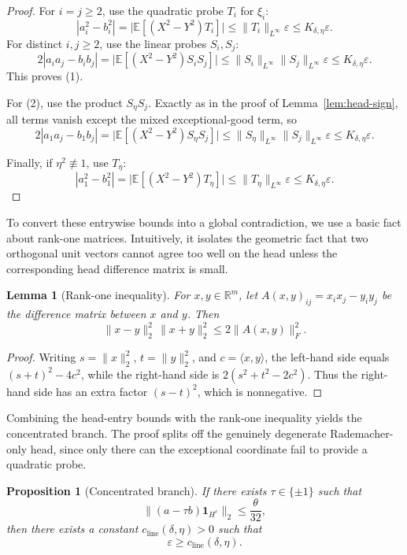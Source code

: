 \documentclass[11pt]{amsart}
\numberwithin{equation}{section}
\newtheorem{proposition}[theorem]{Proposition}
\newtheorem{lemma}[theorem]{Lemma}
\theoremstyle{definition}
\theoremstyle{remark}
\newcommand{\E}{\mathbb E}
\newcommand{\R}{\mathbb R}
\newcommand{\eps}{\varepsilon}
\newcommand{\norm}[1]{\lVert #1 \rVert}
\newcommand{\ip}[2]{\langle #1,#2\rangle}
\begin{document}
\begin{proof}
For $i=j\ge2$, use the quadratic probe $T_i$ for $\xi_i$:
\[
|a_i^2-b_i^2|
=\bigl|\E[(X^2-Y^2)T_i]\bigr|
\le \norm{T_i}_{L^\infty}\eps
\le K_{\delta,\eta}\eps.
\]
For distinct $i,j\ge2$, use the linear probes $S_i,S_j$:
\[
2|a_i a_j-b_i b_j|
=\bigl|\E[(X^2-Y^2)S_iS_j]\bigr|
\le \norm{S_i}_{L^\infty}\norm{S_j}_{L^\infty}\eps
\le K_{\delta,\eta}\eps.
\]
This proves \rm(1).

For \rm(2), use the product $S_\eta S_j$.  Exactly as in the proof of
Lemma~\ref{lem:head-sign}, all terms vanish except the mixed
exceptional-good term, so
\[
2|a_1a_j-b_1b_j|
=\bigl|\E[(X^2-Y^2)S_\eta S_j]\bigr|
\le \norm{S_\eta}_{L^\infty}\norm{S_j}_{L^\infty}\eps
\le K_{\delta,\eta}\eps.
\]

Finally, if $\eta^2\not\equiv1$, use $T_\eta$:
\[
|a_1^2-b_1^2|
=\bigl|\E[(X^2-Y^2)T_\eta]\bigr|
\le \norm{T_\eta}_{L^\infty}\eps
\le K_{\delta,\eta}\eps.
\]
\end{proof}

To convert these entrywise bounds into a global contradiction, we use a basic fact about rank-one matrices. Intuitively,  it isolates the geometric fact that two orthogonal unit vectors cannot agree too well on the
head unless the corresponding head difference matrix is small.

\begin{lemma}[Rank-one inequality]\label{lem:rank-one}
For $x,y\in\R^m$, let $A(x,y)_{ij}=x_ix_j-y_iy_j$ be the difference matrix between $x$ and $y$. Then
\[
\norm{x-y}_2^2\,\norm{x+y}_2^2\le 2\norm{A(x,y)}_F^2.
\]
\end{lemma}

\begin{proof}
Writing $s=\norm{x}_2^2$, $t=\norm{y}_2^2$, and $c=\ip{x}{y}$, the left-hand
side equals $(s+t)^2-4c^2$, while the right-hand side is
$2(s^2+t^2-2c^2)$.  Thus the right-hand side has an extra factor $(s-t)^2$, which is nonnegative.
\end{proof}

Combining the head-entry bounds with the rank-one inequality yields the
concentrated branch.  The proof splits off the genuinely degenerate
Rademacher-only head, since only there can the exceptional coordinate fail to
provide a quadratic probe.

\begin{proposition}[Concentrated branch]\label{prop:concentrated}
If there exists $\tau\in\{\pm1\}$ such that
\[
\norm{(a-\tau b)\mathbf 1_{H^c}}_2\le \frac{\theta}{32},
\]
then there exists a constant $c_{\mathrm{line}}(\delta,\eta)>0$ such that
\[
\eps\ge c_{\mathrm{line}}(\delta,\eta).
\]
\end{proposition}
\end{document}
